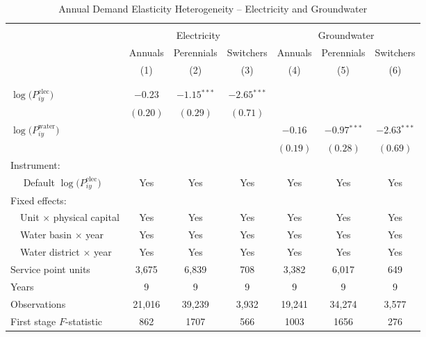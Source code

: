 \begin{table}[t!]\centering
\small
\caption{Annual Demand Elasticity Heterogeneity -- Electricity and Groundwater \label{tab:ann_regs_het}}
\vspace{-0.1cm}
\small
\begin{adjustbox}{center} 
\begin{tabular}{lcccccc} 
\hline \hline
\vspace{-0.37cm}
\\
 & \multicolumn{3}{c}{Electricity} & \multicolumn{3}{c}{Groundwater} \\
 \cmidrule(r){2-4} \cmidrule(l){5-7}
 & Annuals & Perennials & Switchers & Annuals & Perennials & Switchers \\
[0.1em]
 & (1)  & (2)  & (3)  & (4)  & (5)  & (6) \\ 
\vspace{-0.37cm}
\\
\cline{2-7}
\vspace{-0.27cm}
\\
 $\log\big(P^{\text{elec}}_{iy}\big)$ ~ & $-0.23$  & $-1.15$$^{***}$ & $-2.65$$^{***}$ &  &  &  \\ 
& $(0.20)$ & $(0.29)$ & $(0.71)$ &  &  &  \\
[0.1em] 
 $\log\big(P^{\text{water}}_{iy}\big)$ ~ &  &  &  & $-0.16$ & $-0.97$$^{***}$  & $-2.63$$^{***}$ \\ 
&  &  &  & $(0.19)$ & $(0.28)$ & $(0.69)$ \\
[1.5em] 
Instrument: \\
[0.1em] 
~~ Default $\log\big(P^{\text{elec}}_{iy}\big)$  & Yes & Yes & Yes  & Yes  & Yes & Yes \\
[1.5em] 
Fixed effects: \\
[0.1em] 
~~Unit $\times$ physical capital & Yes & Yes & Yes & Yes & Yes & Yes  \\
[0.1em] 
~~Water basin $\times$ year & Yes & Yes & Yes & Yes & Yes & Yes \\
[0.1em] 
~~Water district $\times$ year & Yes & Yes & Yes & Yes & Yes & Yes \\
[1.5em] 
Service point units & 3,675 & 6,839 & 708 & 3,382 & 6,017 & 649  \\ 
[0.1em] 
Years  & 9 & 9 & 9 & 9 & 9 & 9 \\ 
[0.1em] 
Observations & 21,016 & 39,239 & 3,932 & 19,241 & 34,274 & 3,577 \\ 
[0.1em] 
First stage $F$-statistic & 862 & 1707 & 566 & 1003 & 1656 & 276 \\ 
[0.15em]
\hline

\end{tabular}
\end{adjustbox}
\end{table}
